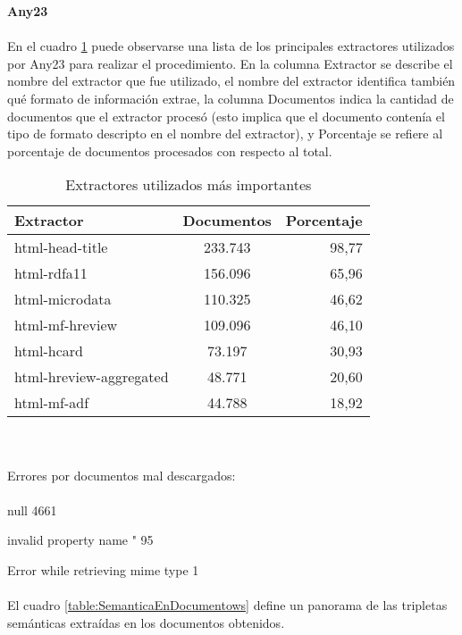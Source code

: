 \textbf{Any23}
\\\\
En el cuadro \ref{table:Extractors} puede observarse una lista de los principales extractores utilizados por Any23 para realizar el 
procedimiento. En la columna Extractor se describe el nombre del extractor que fue utilizado, el nombre del extractor identifica también qué formato de 
información extrae, la columna Documentos indica la cantidad de documentos que el extractor procesó (esto implica que el documento contenía el tipo de formato descripto en el nombre del extractor), y 
Porcentaje se refiere al porcentaje de documentos procesados con respecto al total.
\begin{table}[h]
\begin{tabular}{| l | c | r | }\hline
Extractor & Documentos & Porcentaje \\\hline
html-head-title & 233.743 & 98,77 \\    
html-rdfa11 & 156.096 & 65,96 \\
html-microdata & 110.325 & 46,62 \\    
html-mf-hreview & 109.096 & 46,10 \\
html-hcard & 73.197 & 30,93  \\
html-hreview-aggregated & 48.771 & 20,60 \\
html-mf-adf & 44.788 & 18,92 \\\hline
 \end{tabular}
\caption{Extractores utilizados más importantes}
\label{table:Extractors}
\end{table}
\\
\\
Errores por documentos mal descargados:
\\\\
null 4661

\noindent invalid property name " 95

\noindent Error while retrieving mime type 1
\\ 
\\ 
El cuadro \ref{table:SemanticaEnDocumentows} define un panorama de las tripletas semánticas extraídas en los documentos obtenidos.

